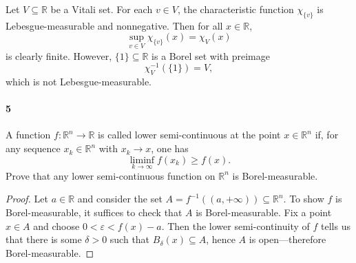 \documentclass[12pt]{article}
\newlength{\myparskip}
\newenvironment{fullbox}{\begin{lrbox}{\savefullbox}\begin{minipage}{\dimexpr\textwidth-2\fboxsep\relax}\setlength{\parskip}{\myparskip}}{\end{minipage}\end{lrbox}\framebox[\textwidth]{\usebox{\savefullbox}}}
\newenvironment{pbox}[1][]{\begin{fullbox}\ifx#1\empty\else\paragraph{#1}\fi}{\end{fullbox}}
\theoremstyle{definition}
\newcommand{\R}{\mathbb{R}}
\newcommand{\eps}{\varepsilon}
\newcommand{\<}{\langle}
\renewcommand{\>}{\rangle}
\begin{document}
Let $V \subseteq \R$ be a Vitali set.
For each $v \in V$, the characteristic function $\chi_{\{v\}}$ is Lebesgue-measurable and nonnegative.
Then for all $x \in \R$,
\[
    \sup_{v \in V} \chi_{\{v\}}(x) = \chi_V(x)
\]
is clearly finite. However, $\{1\} \subseteq \R$ is a Borel set with preimage
\[
    \chi_V^{-1}(\{1\}) = V,
\]
which is not Lebesgue-measurable.


\begin{pbox}[5]
    A function $f : \R^n \to \R$ is called lower semi-continuous at the point $x \in \R^n$ if, for any sequence $x_k \in \R^n$ with $x_k \to x$, one has
    \[
        \liminf_{k \to \infty} f(x_k) \geq f(x).
    \]
    Prove that any lower semi-continuous function on $\R^n$ is Borel-measurable.
\end{pbox}

\begin{proof}
    Let $a \in \R$ and consider the set $A = f^{-1}((a, +\infty)) \subseteq \R^n$.
    To show $f$ is Borel-measurable, it suffices to check that $A$ is Borel-measurable.
    Fix a point $x \in A$ and choose $0 < \eps < f(x) - a$.
    Then the lower semi-continuity of $f$ tells us that there is some $\delta > 0$ such that $B_{\delta}(x) \subseteq A$, hence $A$ is open---therefore Borel-measurable. 
\end{proof}
\end{document}
